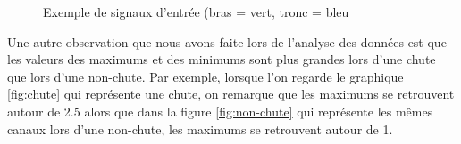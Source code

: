 \documentclass[12pt,letterpaper]{article}
\begin{document}
\begin{figure}

    \caption{Exemple de signaux d'entrée (bras = vert, tronc = bleu}
    \label{fig:canaux_input}
\end{figure}

Une autre observation que nous avons faite lors de l'analyse des données est que les valeurs des maximums et des minimums sont plus grandes lors d'une chute que lors d'une non-chute. Par exemple, lorsque l'on regarde le graphique \ref{fig:chute} qui représente une chute, on remarque que les maximums se retrouvent autour de 2.5 alors que dans la figure \ref{fig:non-chute} qui représente les mêmes canaux lors d'une non-chute, les maximums se retrouvent autour de 1.
\end{document}
